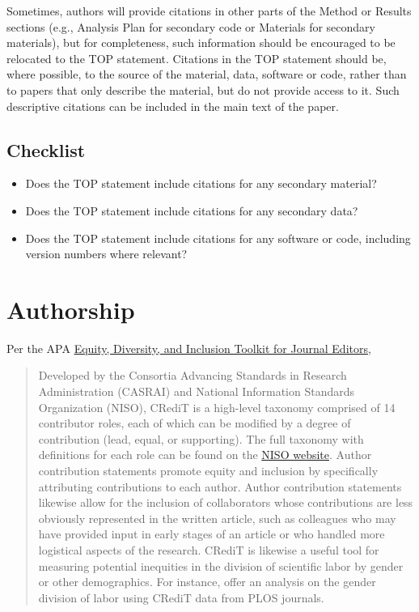 \documentclass[
  oneside]{book}
\providecommand{\tightlist}{%
  \setlength{\itemsep}{0pt}\setlength{\parskip}{0pt}}
\begin{document}
Sometimes, authors will provide citations in other parts of the Method or Results sections (e.g., Analysis Plan for secondary code or Materials for secondary materials), but for completeness, such information should be encouraged to be relocated to the TOP statement. Citations in the TOP statement should be, where possible, to the source of the material, data, software or code, rather than to papers that only describe the material, but do not provide access to it. Such descriptive citations can be included in the main text of the paper.

\hypertarget{checklist-4}{%
\section{Checklist}\label{checklist-4}}

\begin{itemize}
\tightlist
\item
  Does the TOP statement include citations for any secondary material?
\item
  Does the TOP statement include citations for any secondary data?
\item
  Does the TOP statement include citations for any software or code, including version numbers where relevant?
\end{itemize}

\hypertarget{editors-authorship}{%
\chapter{Authorship}\label{editors-authorship}}

Per the APA \href{https://www.apa.org/pubs/authors/equity-diversity-inclusion-toolkit}{Equity, Diversity, and Inclusion Toolkit for Journal Editors},

\begin{quote}
Developed by the Consortia Advancing Standards in Research Administration (CASRAI) and National Information Standards Organization (NISO), CRediT is a high-level taxonomy comprised of 14 contributor roles, each of which can be modified by a degree of contribution (lead, equal, or supporting). The full taxonomy with definitions for each role can be found on the \href{https://casrai.org/credit/}{NISO website}. Author contribution statements promote equity and inclusion by specifically attributing contributions to each author. Author contribution statements likewise allow for the inclusion of collaborators whose contributions are less obviously represented in the written article, such as colleagues who may have provided input in early stages of an article or who handled more logistical aspects of the research. CRediT is likewise a useful tool for measuring potential inequities in the division of scientific labor by gender or other demographics. For instance, \citet{lariviere2021investigating} offer an analysis on the gender division of labor using CRediT data from PLOS journals.
\end{quote}
\end{document}
